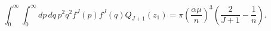 \begin{equation}
\int_{0}^{\infty }\int_{0}^{\infty
}dp\,dq\,p^{2}q^{2}f^{J}(p)f^{J}(q)Q_{J+1}\left( z_{1}\right) =\pi \left( 
\frac{\alpha \mu }{n}\right) ^{3}\left( \frac{2}{J+1}-\frac{1}{n}\right) .
\end{equation}

